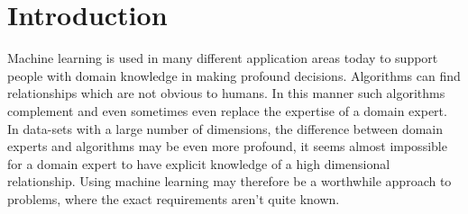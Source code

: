 \documentclass[conference]{IEEEtran}
\begin{document}
\maketitle









%
\IEEEpeerreviewmaketitle



\section{Introduction}
Machine learning is used in many different application areas today to support people with domain knowledge in making profound decisions. Algorithms can find relationships which are not obvious to humans. In this manner such algorithms complement and even sometimes even replace the expertise of a domain expert. In data-sets with a large number of dimensions, the difference between domain experts and algorithms may be even more profound, it seems almost impossible for a domain expert to have explicit knowledge of a high dimensional relationship. Using machine learning may therefore be a worthwhile approach to problems, where the exact requirements aren't quite known.
\end{document}

